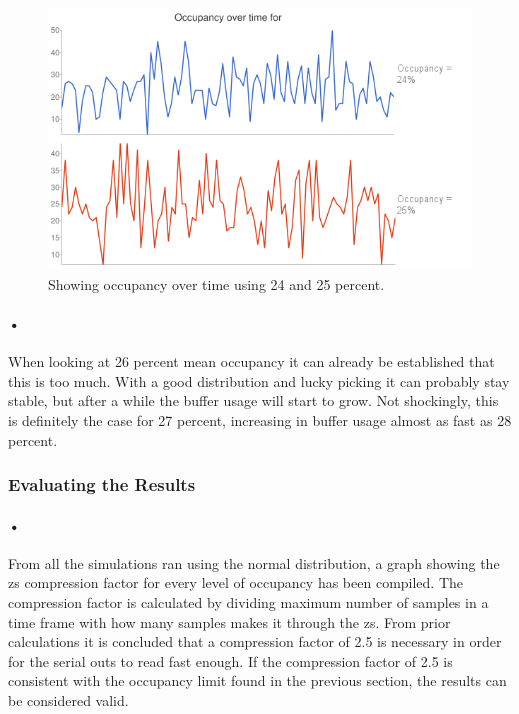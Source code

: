 \documentclass[a4paper, 12pt]{report}
\begin{document}
\begin{figure}[h!]
	\centering
		\includegraphics[width=1.0\textwidth]{images/occ-over-time.png}
		\caption{Showing occupancy over time using 24 and 25 percent.}
		\label{fig:occ-over-time}
\end{figure}

\paragraph{•}
When looking at 26 percent mean occupancy it can already be established that this is too much.
With a good distribution and lucky picking it can probably stay stable, but after a while the buffer usage will start to grow.
Not shockingly, this is definitely the case for 27 percent, increasing in buffer usage almost as fast as 28 percent.

\subsubsection{Evaluating the Results}

\paragraph{•}
From all the simulations ran using the normal distribution, a graph showing the \gls{zs} compression factor for every level of occupancy has been compiled.
The compression factor is calculated by dividing maximum number of samples in a time frame with how many samples makes it through the \gls{zs}.
From prior calculations it is concluded that a compression factor of 2.5 is necessary in order for the serial outs to read fast enough.
If the compression factor of 2.5 is consistent with the occupancy limit found in the previous section, the results can be considered valid.
\end{document}
